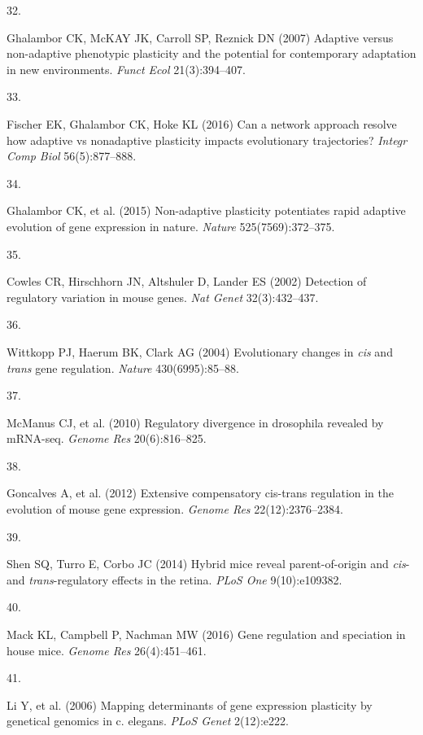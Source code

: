 \documentclass[9pt,twocolumn,twoside,lineno]{pnas-new}
\newlength{\cslhangindent}
\newlength{\csllabelwidth}
\newlength{\cslentryspacingunit} %
\newenvironment{CSLReferences}[2] %
 {%
  \setlength{\parindent}{0pt}
  \ifodd #1
  \let\oldpar\par
  \def\par{\hangindent=\cslhangindent\oldpar}
  \fi
  \setlength{\parskip}{#2\cslentryspacingunit}
 }%
 {}
\newcommand{\CSLLeftMargin}[1]{\parbox[t]{\csllabelwidth}{#1}}
\newcommand{\CSLRightInline}[1]{\parbox[t]{\linewidth - \csllabelwidth}{#1}\break}
\begin{document}
\begin{CSLReferences}{0}{0}
\leavevmode\hypertarget{ref-Ghalambor2007}{}%
\CSLLeftMargin{32. }
\CSLRightInline{Ghalambor CK, McKAY JK, Carroll SP, Reznick DN (2007)
Adaptive versus non-adaptive phenotypic plasticity and the potential for
contemporary adaptation in new environments. \emph{Funct Ecol}
21(3):394--407.}

\leavevmode\hypertarget{ref-Fischer2016}{}%
\CSLLeftMargin{33. }
\CSLRightInline{Fischer EK, Ghalambor CK, Hoke KL (2016) Can a network
approach resolve how adaptive vs nonadaptive plasticity impacts
evolutionary trajectories? \emph{Integr Comp Biol} 56(5):877--888.}

\leavevmode\hypertarget{ref-Ghalambor2015}{}%
\CSLLeftMargin{34. }
\CSLRightInline{Ghalambor CK, et al. (2015) Non-adaptive plasticity
potentiates rapid adaptive evolution of gene expression in nature.
\emph{Nature} 525(7569):372--375.}

\leavevmode\hypertarget{ref-Cowles2002}{}%
\CSLLeftMargin{35. }
\CSLRightInline{Cowles CR, Hirschhorn JN, Altshuler D, Lander ES (2002)
Detection of regulatory variation in mouse genes. \emph{Nat Genet}
32(3):432--437.}

\leavevmode\hypertarget{ref-Wittkopp2004}{}%
\CSLLeftMargin{36. }
\CSLRightInline{Wittkopp PJ, Haerum BK, Clark AG (2004) Evolutionary
changes in \emph{cis} and \emph{trans} gene regulation. \emph{Nature}
430(6995):85--88.}

\leavevmode\hypertarget{ref-McManus2010}{}%
\CSLLeftMargin{37. }
\CSLRightInline{McManus CJ, et al. (2010) Regulatory divergence in
drosophila revealed by {mRNA-seq}. \emph{Genome Res} 20(6):816--825.}

\leavevmode\hypertarget{ref-Goncalves2012}{}%
\CSLLeftMargin{38. }
\CSLRightInline{Goncalves A, et al. (2012) Extensive compensatory
cis-trans regulation in the evolution of mouse gene expression.
\emph{Genome Res} 22(12):2376--2384.}

\leavevmode\hypertarget{ref-Shen2014}{}%
\CSLLeftMargin{39. }
\CSLRightInline{Shen SQ, Turro E, Corbo JC (2014) Hybrid mice reveal
parent-of-origin and \emph{cis}- and \emph{trans}-regulatory effects in
the retina. \emph{PLoS One} 9(10):e109382.}

\leavevmode\hypertarget{ref-Mack2016}{}%
\CSLLeftMargin{40. }
\CSLRightInline{Mack KL, Campbell P, Nachman MW (2016) Gene regulation
and speciation in house mice. \emph{Genome Res} 26(4):451--461.}

\leavevmode\hypertarget{ref-Li2006}{}%
\CSLLeftMargin{41. }
\CSLRightInline{Li Y, et al. (2006) Mapping determinants of gene
expression plasticity by genetical genomics in c. elegans. \emph{PLoS
Genet} 2(12):e222.}


\end{CSLReferences}
\end{document}
